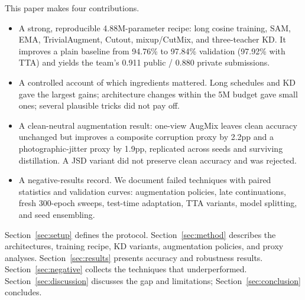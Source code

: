 This paper makes four contributions.
\begin{itemize}
\item A strong, reproducible 4.88M-parameter recipe: long cosine training, SAM,
EMA, TrivialAugment, Cutout, mixup/CutMix, and three-teacher KD. It improves a
plain baseline from 94.76\% to 97.84\% validation (97.92\% with TTA) and yields
the team's 0.911 public / 0.880 private submissions.
\item A controlled account of which ingredients mattered. Long schedules and KD
gave the largest gains; architecture changes within the 5M budget gave small ones;
several plausible tricks did not pay off.
\item A clean-neutral augmentation result: one-view AugMix leaves clean accuracy
unchanged but improves a composite corruption proxy by 2.2pp and a
photographic-jitter proxy by 1.9pp, replicated across seeds and surviving
distillation. A JSD variant did not preserve clean accuracy and was rejected.
\item A negative-results record. We document failed techniques with paired
statistics and validation curves: augmentation policies, late continuations,
fresh 300-epoch sweeps, test-time adaptation, TTA variants, model splitting, and
seed ensembling.
\end{itemize}

Section~\ref{sec:setup} defines the protocol. Section~\ref{sec:method} describes
the architectures, training recipe, KD variants, augmentation policies, and proxy
analyses. Section~\ref{sec:results} presents accuracy and robustness results.
Section~\ref{sec:negative} collects the techniques that underperformed.
Section~\ref{sec:discussion} discusses the gap and limitations;
Section~\ref{sec:conclusion} concludes.
